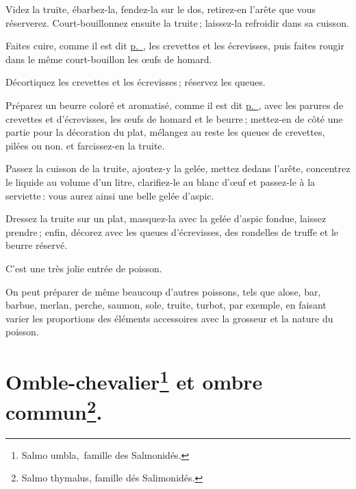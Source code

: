 Videz la truite, ébarbez-la, fendez-la sur le dos, retirez-en l'arête que vous
réserverez. Court-bouillonnez ensuite la truite ; laissez-la refroidir dans sa
cuisson.

Faites cuire, comme il est dit \hyperlink{p0287}{p. \pageref{pg0287}}, les
crevettes et les écrevisses, puis faites rougir dans le même court-bouillon les
œufs de homard.

Décortiquez les crevettes et les écrevisses ; réservez les queues.

Préparez un beurre coloré et aromatisé, comme il est dit
\hyperlink{p0287-3}{p. \pageref{pg0287}}, avec les parures de crevettes et
d'écrevisses, les œufs de homard et le beurre ; mettez-en de côté une partie
pour la décoration du plat, mélangez au reste les queues de crevettes, pilées
ou non. et farcissez-en la truite.

Passez la cuisson de la truite, ajoutez-y la gelée, mettez dedans l'arête,
concentrez le liquide au volume d'un litre, clarifiez-le au blanc d'œuf et
passez-le à la serviette : vous aurez ainsi une belle gelée d'aspic.

Dressez la truite sur un plat, masquez-la avec la gelée d'aspic fondue, laissez
prendre ; enfin, décorez avec les queues d'écrevisses, des rondelles de truffe
et le beurre réservé.

C'est une très jolie entrée de poisson.

\sk

On peut préparer de même beaucoup d'autres poissons, tels que alose, bar,
barbue, merlan, perche, saumon, sole, truite, turbot, par exemple, en faisant
varier les proportions des éléments accessoires avec la grosseur et la nature
du poisson.

\section*{\centering Omble-chevalier\footnote{Salmo umbla, famille des Salmonidés.}
                  et ombre commun\footnote{Salmo thymalus, famille dés Salimonidés.}.}


